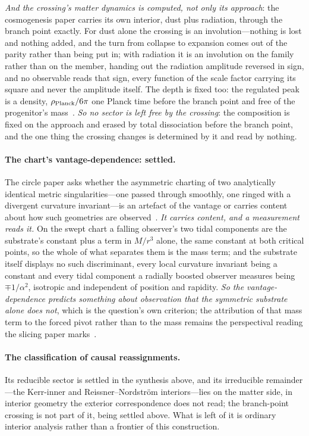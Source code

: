 \documentclass[11pt,a4paper]{article}
\theoremstyle{plain}
\theoremstyle{definition}
\theoremstyle{remark}
\begin{document}
\emph{And the crossing's matter dynamics is computed, not only its approach}: the cosmogenesis paper carries its own interior, dust plus radiation, through the branch point exactly. For dust alone the crossing is an involution---nothing is lost and nothing added, and the turn from collapse to expansion comes out of the parity rather than being put in; with radiation it is an involution on the family rather than on the member, handing out the radiation amplitude reversed in sign, and no observable reads that sign, every function of the scale factor carrying its square and never the amplitude itself. The depth is fixed too: the regulated peak is a density, $\rho_{\rm Planck}/6\pi$ one Planck time before the branch point and free of the progenitor's mass~\cite{JanzenCosmogenesis}. \emph{So no sector is left free by the crossing}: the composition is fixed on the approach and erased by total dissociation before the branch point, and the one thing the crossing changes is determined by it and read by nothing.

\paragraph{The chart's vantage-dependence: settled.} The circle paper asks whether the asymmetric charting of two analytically identical metric singularities---one passed through smoothly, one ringed with a divergent curvature invariant---is an artefact of the vantage or carries content about how such geometries are observed~\cite{JanzenCircle}. \emph{It carries content, and a measurement reads it.} On the swept chart a falling observer's two tidal components are the substrate's constant plus a term in $M/r^{3}$ alone, the same constant at both critical points, so the whole of what separates them is the mass term; and the substrate itself displays no such discriminant, every local curvature invariant being a constant and every tidal component a radially boosted observer measures being $\mp1/\alpha^{2}$, isotropic and independent of position and rapidity. \emph{So the vantage-dependence predicts something about observation that the symmetric substrate alone does not}, which is the question's own criterion; the attribution of that mass term to the forced pivot rather than to the mass remains the perspectival reading the slicing paper marks~\cite{JanzenSlicing}.

\paragraph{The classification of causal reassignments.} Its reducible sector is settled in the synthesis above, and its irreducible remainder---the Kerr-inner and Reissner--Nordstr\"om interiors---lies on the matter side, in interior geometry the exterior correspondence does not read; the branch-point crossing is not part of it, being settled above. What is left of it is ordinary interior analysis rather than a frontier of this construction.
\end{document}
